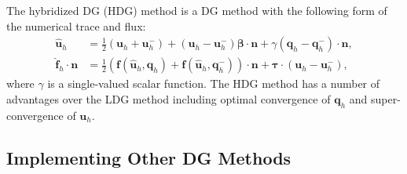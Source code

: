 \documentclass[11pt]{article}
\begin{document}
The hybridized DG (HDG) method \cite{Cockburn2009b,Fernandez2017a,Nguyen2012} is a DG method with the following form of the numerical trace and flux:
\begin{equation}
\label{HDG}
\begin{split}
\widehat{\bm{u}}_h  &= \frac{1}{2} (\bm u_h + \bm u_h^{-}) +  (\bm u_h - \bm u_h^-) \bm \beta \cdot \bm n + \gamma  (\bm q_h - \bm q_h^-) \cdot \bm n, \\
\widehat{\bm{f}}_h \cdot \bm n & = \frac{1}{2} \left( \bm{f}(\widehat{\bm{u}}_h , \bm{q}_h)  + \bm{f}(\widehat{\bm{u}}_h , \bm{q}_h^-)  \right) \cdot \bm{n} +  \bm{\tau} \cdot ( \bm{u}_h - {\bm{u}}_h^-) ,
\end{split}
\end{equation}
where $\gamma$ is a single-valued scalar function. The HDG method has a number of advantages over the LDG method  including optimal convergence of $\bm q_h$ and super-convergence of $\bm u_h$. 

\subsection{Implementing Other DG Methods}
\end{document}
